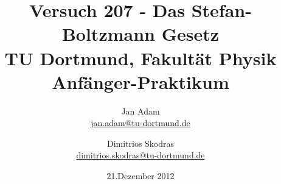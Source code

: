 

\usepackage{float}
\usepackage{caption}




\title{Versuch 207 - Das Stefan-Boltzmann Gesetz\\				%
\large TU Dortmund, Fakultät Physik\\ 
\normalsize Anfänger-Praktikum}

\author{Jan Adam\\			%
{\small \href{jan.adam@tu-dortmund.de}{jan.adam@tu-dortmund.de}}	%
\and						%
Dimitrios Skodras\\					%
{\small \href{dimitrios.skodras@tu-dortmund.de}{dimitrios.skodras@tu-dortmund.de}}		%
}
\date{21.Dezember 2012}				%





\maketitle					%
\thispagestyle{empty} 				%



\tableofcontents


\newpage					%


